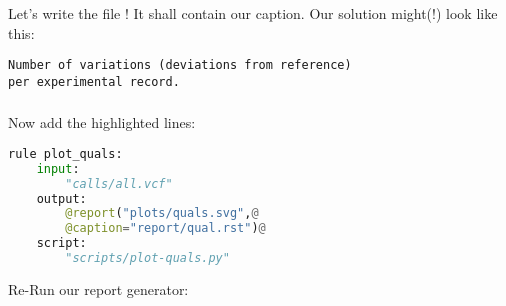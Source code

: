 \begin{frame}[fragile]
  \frametitle{}
  Let's write the file ! It shall contain our caption.
  \pause
  Our solution might(!) look like this:
  \begin{lstlisting}
Number of variations (deviations from reference) 
per experimental record. 
  \end{lstlisting}	
\end{frame}

\begin{frame}[fragile]
	\frametitle{}
	Now add the highlighted lines:
	\begin{lstlisting}[language=Python,style=Python]
rule plot_quals:
    input:
	    "calls/all.vcf"
	output:
		@report("plots/quals.svg",@ 
		@caption="report/qual.rst")@
	script:
		"scripts/plot-quals.py"
	\end{lstlisting}
    \begin{task}{Re-Run our report generator:}
    \end{task}
\end{frame}



